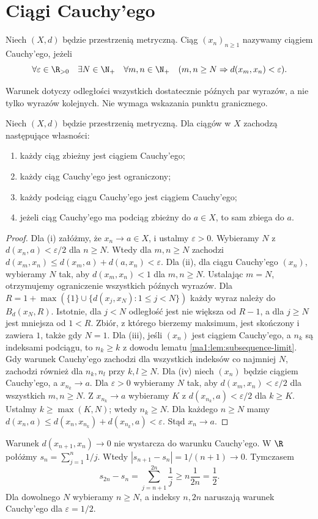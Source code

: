 \section{Ciągi Cauchy'ego}
\begin{definicja}
\label{ma1:def:cauchy-sequence}
Niech $(X,d)$ będzie przestrzenią metryczną. Ciąg $(x_n)_{n\ge1}$ nazywamy ciągiem Cauchy'ego, jeżeli
\[
 \forall\varepsilon\in\R_{>0}\quad\exists N\in\N_+\quad
 \forall m,n\in\N_+\quad (m,n\ge N\Rightarrow d(x_m,x_n)<\varepsilon).
\]
\end{definicja}
Warunek dotyczy odległości wszystkich dostatecznie późnych par wyrazów, a nie tylko wyrazów kolejnych. Nie wymaga wskazania punktu granicznego.

\begin{twierdzenie}
\label{ma1:thm:cauchy-basic}
Niech $(X,d)$ będzie przestrzenią metryczną. Dla ciągów w $X$ zachodzą następujące własności:
\begin{enumerate}[label=(\roman*)]
\item każdy ciąg zbieżny jest ciągiem Cauchy'ego;
\item każdy ciąg Cauchy'ego jest ograniczony;
\item każdy podciąg ciągu Cauchy'ego jest ciągiem Cauchy'ego;
\item jeżeli ciąg Cauchy'ego ma podciąg zbieżny do $a\in X$, to sam zbiega do $a$.
\end{enumerate}
\end{twierdzenie}
\begin{proof}
Dla (i) załóżmy, że $x_n\to a\in X$, i ustalmy $\varepsilon>0$. Wybieramy $N$ z $d(x_n,a)<\varepsilon/2$ dla $n\ge N$. Wtedy dla $m,n\ge N$ zachodzi $d(x_m,x_n)\le d(x_m,a)+d(a,x_n)<\varepsilon$.
Dla (ii), dla ciągu Cauchy'ego $(x_n)$, wybieramy $N$ tak, aby $d(x_m,x_n)<1$ dla $m,n\ge N$. Ustalając $m=N$, otrzymujemy ograniczenie wszystkich późnych wyrazów. Dla
$R=1+\max(\{1\}\cup\{d(x_j,x_N):1\le j<N\})$ każdy wyraz należy do $B_d(x_N,R)$. Istotnie, dla $j<N$ odległość jest nie większa od $R-1$, a dla $j\ge N$ jest mniejsza od $1<R$. Zbiór, z którego bierzemy maksimum, jest skończony i zawiera $1$, także gdy $N=1$.
Dla (iii), jeśli $(x_n)$ jest ciągiem Cauchy'ego, a $n_k$ są indeksami podciągu, to $n_k\ge k$ z dowodu lematu \ref{ma1:lem:subsequence-limit}. Gdy warunek Cauchy'ego zachodzi dla wszystkich indeksów co najmniej $N$, zachodzi również dla $n_k,n_l$ przy $k,l\ge N$.
Dla (iv) niech $(x_n)$ będzie ciągiem Cauchy'ego, a $x_{n_k}\to a$. Dla $\varepsilon>0$ wybieramy $N$ tak, aby $d(x_m,x_n)<\varepsilon/2$ dla wszystkich $m,n\ge N$. Z $x_{n_k}\to a$ wybieramy $K$ z $d(x_{n_k},a)<\varepsilon/2$ dla $k\ge K$. Ustalmy $k\ge\max(K,N)$; wtedy $n_k\ge N$. Dla każdego $n\ge N$ mamy $d(x_n,a)\le d(x_n,x_{n_k})+d(x_{n_k},a)<\varepsilon$. Stąd $x_n\to a$.
\end{proof}
\begin{przyklad}
Warunek $d(x_{n+1},x_n)\to0$ nie wystarcza do warunku Cauchy'ego. W $\R$ połóżmy $s_n=\sum_{j=1}^n 1/j$. Wtedy $|s_{n+1}-s_n|=1/(n+1)\to0$. Tymczasem
\[
 s_{2n}-s_n=\sum_{j=n+1}^{2n}\frac1j
 \ge n\frac1{2n}=\frac12.
\]
Dla dowolnego $N$ wybieramy $n\ge N$, a indeksy $n,2n$ naruszają warunek Cauchy'ego dla $\varepsilon=1/2$.
\end{przyklad}


